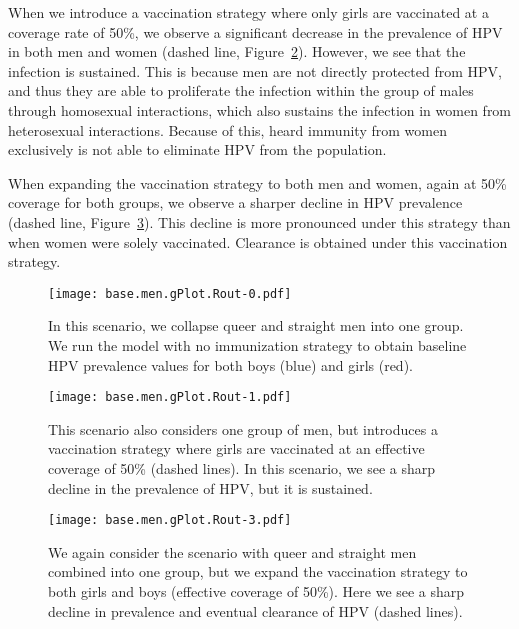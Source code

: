 \documentclass[12pt]{article}
\begin{document}
When we introduce a vaccination strategy where only girls are vaccinated at a coverage rate of 50\%, we observe a significant decrease in the prevalence of HPV in both men and women (dashed line, Figure~\ref{fig:menGirlVacc50}).  However, we see that the infection is sustained.  This is because men are not directly protected from HPV, and thus they are able to proliferate the infection within the group of males through homosexual interactions, which also sustains the infection in women from heterosexual interactions.  Because of this, heard immunity from women exclusively is not able to eliminate HPV from the population. 

When expanding the vaccination strategy to both men and women, again at 50\% coverage for both groups, we observe a sharper decline in HPV prevalence (dashed line, Figure~\ref{fig:menAllVacc50}).  This decline is more pronounced under this strategy than when women were solely vaccinated.  Clearance is obtained under this vaccination strategy.  

\begin{figure}[h!]
\begin{center}
\texttt{[image: base.men.gPlot.Rout-0.pdf]}
\caption{In this scenario, we collapse queer and straight men into one group.  We run the model with no immunization strategy to obtain baseline HPV prevalence values for both boys (blue) and girls (red).}
\label{fig:menNoVacc}
\end{center}
\end{figure}
\begin{figure}[h!]
\begin{center}
\texttt{[image: base.men.gPlot.Rout-1.pdf]}
\caption{This scenario also considers one group of men, but introduces a vaccination strategy where girls are vaccinated at an effective coverage of 50\% (dashed lines).  In this scenario, we see a sharp decline in the prevalence of HPV, but it is sustained.}
\label{fig:menGirlVacc50}
\end{center}
\end{figure}

\begin{figure}[h!]
\begin{center}
\texttt{[image: base.men.gPlot.Rout-3.pdf]}
\caption{We again consider the scenario with queer and straight men combined into one group, but we expand the vaccination strategy to both girls and boys (effective coverage of 50\%).  Here we see a sharp decline in prevalence and eventual clearance of HPV (dashed lines).}
\label{fig:menAllVacc50}
\end{center}
\end{figure}
\end{document}
